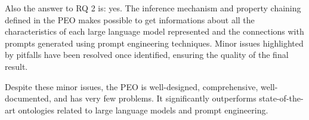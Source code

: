 Also the answer to RQ 2 is: yes.
The inference mechanism and property chaining defined in the PEO makes possible to get informations about all the characteristics of each large language model represented and the connections with prompts generated using prompt engineering techniques. Minor issues highlighted by pitfalls have been resolved once identified, ensuring the quality of the final result.


Despite these minor issues, the PEO is well-designed, comprehensive, well-documented, and has very few problems.
It significantly outperforms state-of-the-art ontologies related to large language models and prompt engineering.